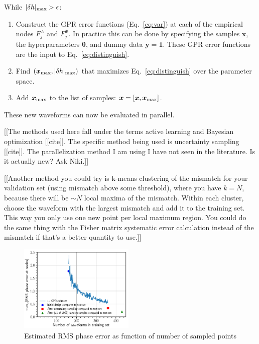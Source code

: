 \documentclass[prd,aps,letter,twocolumn,floatfix,notitlepage,nofootinbib]{revtex4-1}
\begin{document}
While $|\delta h |_{\rm max} > \epsilon$:
\begin{enumerate}
\item Construct the GPR error functions (Eq.~\eqref{eq:var}) at each of the empirical nodes $F^A_j$ and $F^\Phi_j$.
In practice this can be done by specifying the samples ${\bm x}$, the hyperparameters ${\bm \theta}$, and dummy 
data ${\bm y}={\bm 1}$. These GPR error functions are the input to Eq.~\eqref{eq:distinguish}.

\item Find $({\bm x}_{\rm max}, |\delta h |_{\rm max})$ that maximizes Eq.~\eqref{eq:distinguish} over the parameter space. 
\item Add ${\bm x}_{\rm max}$ to the list of samples: ${\bm x} = [{\bm x}, {\bm x}_{\rm max}]$.
\end{enumerate}
These new waveforms can now be evaluated in parallel.

[[The methods used here fall under the terms active learning and Bayesian optimization [[cite]]. The specific method being used is
uncertainty sampling [[cite]]. The parallelization method I am using I have not seen in the literature. Is it actually new? Ask Niki.]]


[[Another method you could try is k-means clustering of the mismatch for your validation set (using mismatch above some threshold), 
where you have $k=N$, because there will
be $\sim N$ local maxima of the mismatch. Within each cluster, choose the waveform with the largest mismatch and add it to the
training set. This way you only use one new point per local maximum region. You could do the same thing with the Fisher matrix
systematic error calculation instead of the mismatch if that's a better quantity to use.]]

\begin{figure}[htb]
\centering
\includegraphics[width=0.49\textwidth]{uncertaintysampling.png}
\caption{Estimated RMS phase error as function of number of sampled points}
\label{fig:uncsamp}
\end{figure}
\end{document}

